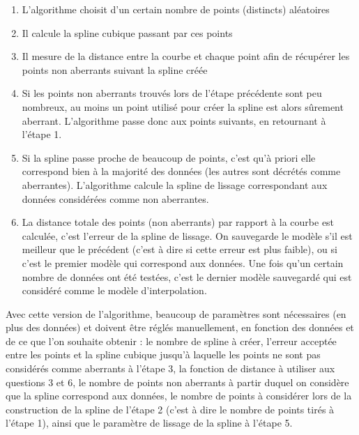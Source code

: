 \documentclass[a4paper,12pt]{article} %
\begin{document}
                    \begin{enumerate}
                    \item
                    L'algorithme choisit d'un certain nombre de points (distincts) aléatoires
                    \item
                    Il calcule la spline cubique passant par ces points 
                    \item
                    Il mesure de la distance entre la courbe et chaque point afin de récupérer les points non aberrants suivant la spline créée
                    \item
                    Si les points non aberrants trouvés lors de l'étape précédente sont peu nombreux, au moins un point utilisé pour créer la spline est alors sûrement aberrant. L'algorithme passe donc aux points suivants, en retournant à l'étape 1.
                    \item
                    Si la spline passe proche de beaucoup de points, c'est qu'à priori elle correspond bien à la majorité des données (les autres sont décrétés comme aberrantes).  L'algorithme calcule la spline de lissage correspondant aux données considérées comme non aberrantes.
                    \item
                    La distance totale des points (non aberrants) par rapport à la courbe est calculée, c'est l'erreur de la spline de lissage. On sauvegarde le modèle s'il est meilleur que le précédent (c'est à dire si cette erreur est plus faible), ou si c'est le premier modèle qui correspond aux données.
                    Une fois qu'un certain nombre de données ont été testées, c'est le dernier modèle sauvegardé qui est considéré comme le modèle d'interpolation.
                    \end{enumerate} 
                    
                    Avec cette version de l'algorithme, beaucoup de paramètres sont nécessaires (en plus des données) et doivent être réglés manuellement, en fonction des données et de ce que l'on souhaite obtenir : le nombre de spline à créer, l'erreur acceptée entre les points et la spline cubique jusqu'à laquelle les points ne sont pas considérés comme aberrants à l'étape 3, la fonction de distance à utiliser aux questions 3 et 6, le nombre de points non aberrants à partir duquel on considère que la spline correspond aux données, le nombre de points à considérer lors de la construction de la spline de l'étape 2 (c'est à dire le nombre de points tirés à l'étape 1), ainsi que le paramètre de lissage de la spline à l'étape 5.
                    
\end{document}
